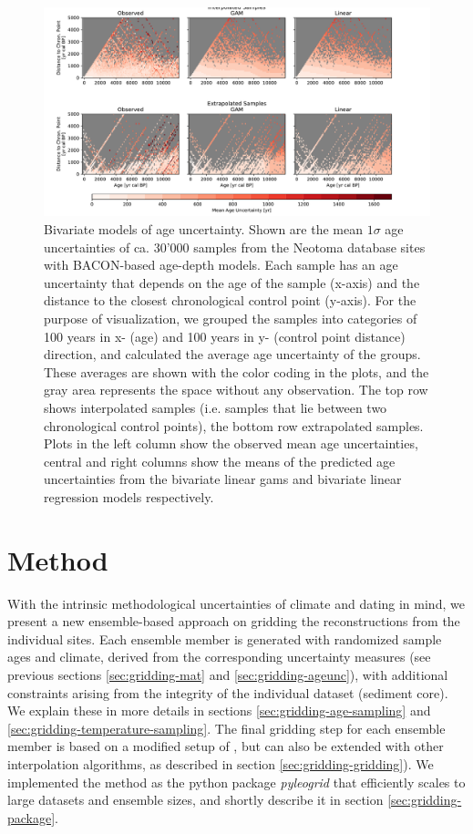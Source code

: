 \documentclass[
11pt, %
english, %
singlespacing, %
headsepline, %
]{MastersDoctoralThesis} %
\begin{document}
\begin{NoHyper}
\begin{refsection}
\begin{figure}
	\includegraphics[width=\linewidth]{gridding-figures/bivariate-models.pdf}
	\caption[Univariate age uncertainty models]{Bivariate models of age uncertainty. Shown are the mean $1\sigma$ age uncertainties of ca. 30'000 samples from the Neotoma database sites with BACON-based age-depth models. Each sample has an age uncertainty that depends on the age of the sample (x-axis) and the distance to the closest chronological control point (y-axis). For the purpose of visualization, we grouped the samples into categories of 100 years in x- (age) and 100 years in y- (control point distance) direction, and calculated the average age uncertainty of the groups. These averages are shown with the color coding in the plots, and the gray area represents the space without any observation. The top row shows interpolated samples (i.e. samples that lie between two chronological control points), the bottom row extrapolated samples. Plots in the left column show the observed mean age uncertainties, central and right columns show the means of the predicted age uncertainties from the bivariate linear \glspl{gam} and bivariate linear regression models respectively. }
	\label{fig:gridding-bivariate-age-unc}
\end{figure}

\section{Method}  \label{sec:gridding-method}
With the intrinsic methodological uncertainties of climate and dating in mind, we present a new ensemble-based approach on gridding the reconstructions from the individual sites. Each ensemble member is generated with randomized sample ages and climate, derived from the corresponding uncertainty measures (see previous sections \ref{sec:gridding-mat} and \ref{sec:gridding-ageunc}), with additional constraints arising from the integrity of the individual dataset (sediment core). We explain these in more details in sections \ref{sec:gridding-age-sampling} and \ref{sec:gridding-temperature-sampling}. The final gridding step for each ensemble member is based on a modified setup of \cite{MauriDavisCollinsEtAl2015}, but can also be extended with other interpolation algorithms, as described in section \ref{sec:gridding-gridding}). We implemented the method as the python package \textit{pyleogrid} that efficiently scales to large datasets and ensemble sizes, and shortly describe it in section \ref{sec:gridding-package}.


\end{refsection}
\end{NoHyper}
\end{document}

